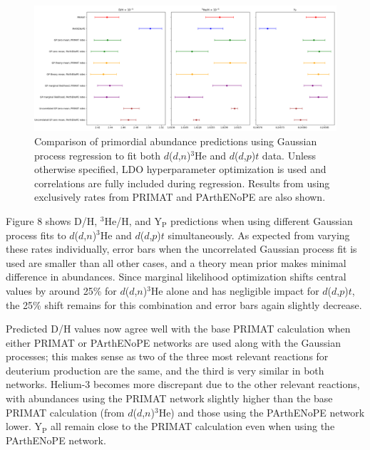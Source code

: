 \documentclass[%
 reprint,
superscriptaddress,
nofootinbib,
 amsmath,amssymb,
 aps,
 pra,
]{revtex4-2}
\begin{document}
\begin{figure}
	\centering
	\includegraphics[width=0.98\linewidth]{Figures/dd_comp.png}
	\caption{Comparison of primordial abundance predictions using Gaussian process regression to fit both $d$($d$,$n$)$^3$He and $d$($d$,$p$)$t$ data. Unless otherwise specified, LDO hyperparameter optimization is used and correlations are fully included during regression. Results from using exclusively rates from PRIMAT and PArthENoPE are also shown.}
\end{figure}

Figure 8 shows D/H, $^3$He/H, and Y$_\text{P}$ predictions when using different Gaussian process fits to $d$($d$,$n$)$^3$He and $d$($d$,$p$)$t$ simultaneously. As expected from varying these rates individually, error bars when the uncorrelated Gaussian process fit is used are smaller than all other cases, and a theory mean prior makes minimal difference in abundances. Since marginal likelihood optimization shifts central values by around 25\% for $d$($d$,$n$)$^3$He alone and has negligible impact for $d$($d$,$p$)$t$, the 25\% shift remains for this combination and error bars again slightly decrease. 

Predicted D/H values now agree well with the base PRIMAT calculation when either PRIMAT or PArthENoPE networks are used along with the Gaussian processes; this makes sense as two of the three most relevant reactions for deuterium production are the same, and the third is very similar in both networks. Helium-3 becomes more discrepant due to the other relevant reactions, with abundances using the PRIMAT network slightly higher than the base PRIMAT calculation (from $d$($d$,$n$)$^3$He) and those using the PArthENoPE network lower. Y$_\text{P}$ all remain close to the PRIMAT calculation even when using the PArthENoPE network. 
\end{document}
